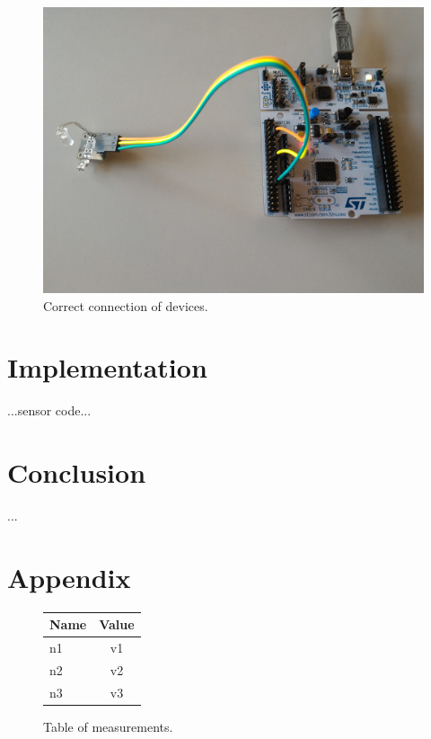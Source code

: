 \documentclass[11pt,a4paper]{article}
\begin{document}
\begin{figure}[H]
    \centering
    \includegraphics[scale=0.1]{img/setup1.jpg}
    \caption{Correct connection of devices.}
    \label{fig:connection}
\end{figure}

\section{Implementation}

...sensor code\cite{SENSOR}...

\section{Conclusion}

...

\newpage %

\section{Appendix}

\begin{figure}[H]
    \begin{center}
        \begin{tabular}{|l|c|}
            \hline
            \textbf{Name} & \textbf{Value} \\
            \hline\hline
            n1 & v1 \\\hline
            n2 & v2 \\\hline
            n3 & v3 \\\hline
        \end{tabular}
    \end{center}
    \caption{Table of measurements.}
    \label{fig:measurements}
\end{figure}
\end{document}
